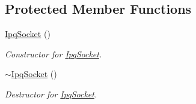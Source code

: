 \subsection*{\-Protected \-Member \-Functions}
\begin{DoxyCompactItemize}
\item 
\hyperlink{classIPQ_1_1IpqSocket_a1fb5a8dbb5d40703b1c43c68dc370c36}{\-Ipq\-Socket} ()
\begin{DoxyCompactList}\small\item\em \-Constructor for \hyperlink{classIPQ_1_1IpqSocket}{\-Ipq\-Socket}. \end{DoxyCompactList}\item 
\hyperlink{classIPQ_1_1IpqSocket_ada019c192f17b98ffa34f8eafc64e500}{$\sim$\-Ipq\-Socket} ()
\begin{DoxyCompactList}\small\item\em \-Destructor for \hyperlink{classIPQ_1_1IpqSocket}{\-Ipq\-Socket}. \end{DoxyCompactList}\end{DoxyCompactItemize}
